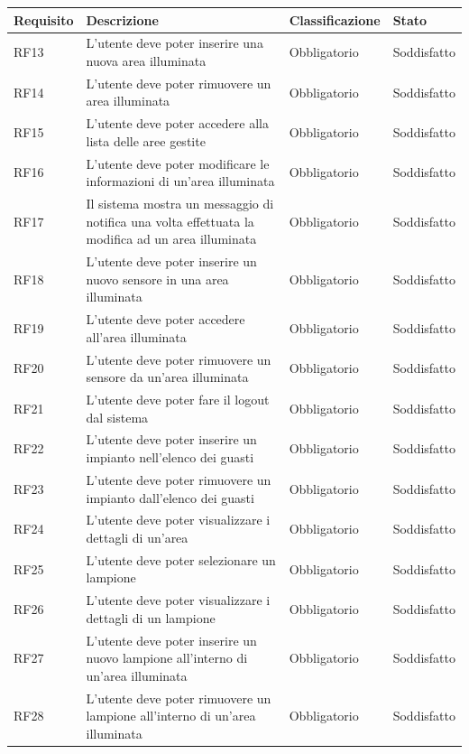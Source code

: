 \documentclass[12pt]{article}
\begin{document}
\begin{tabular}{ |p{1.8cm}|p{5.2cm}|p{2.5cm}| p{3.5cm}| }
	\hline
	Requisito& Descrizione &Classificazione & Stato \\
	\hline
	RF13	 & L'utente deve poter inserire una nuova area illuminata & Obbligatorio & Soddisfatto \\
	\hline
	RF14	 & L'utente deve poter rimuovere un area illuminata & Obbligatorio & Soddisfatto \\
	\hline
	RF15	 & L'utente deve poter accedere alla lista delle aree gestite & Obbligatorio & Soddisfatto \\
	\hline				
	RF16	 & L'utente deve poter modificare le informazioni di un'area illuminata	& Obbligatorio & Soddisfatto \\
	\hline				
	RF17	 & Il sistema mostra un messaggio di notifica una volta effettuata la modifica ad un area illuminata & Obbligatorio & Soddisfatto \\
	\hline				
	RF18	 & L'utente deve poter inserire un nuovo sensore in una area illuminata & Obbligatorio & Soddisfatto \\
	\hline				
	RF19	 & L'utente deve poter accedere all'area illuminata & Obbligatorio & Soddisfatto \\
	\hline 				
	RF20	 & L'utente deve poter rimuovere un sensore da un'area illuminata & Obbligatorio & Soddisfatto \\
	\hline				
	RF21	 & L'utente deve poter fare il logout dal sistema & Obbligatorio & Soddisfatto \\
	\hline										
	RF22	 & L'utente deve poter inserire un impianto nell'elenco dei guasti & Obbligatorio & Soddisfatto \\
	\hline				
	RF23	 & L'utente deve poter rimuovere un impianto dall'elenco dei guasti & Obbligatorio & Soddisfatto \\
	\hline				
	RF24	 & L'utente deve poter visualizzare i dettagli di un'area & Obbligatorio & Soddisfatto \\
	\hline				
	RF25	 & L'utente deve poter selezionare un lampione & Obbligatorio & Soddisfatto \\
	\hline				
	RF26	 & L'utente deve poter visualizzare i dettagli di un lampione & Obbligatorio & Soddisfatto \\
	\hline				
	RF27	 & L'utente deve poter inserire un nuovo lampione all'interno di un'area illuminata & Obbligatorio & Soddisfatto \\
	\hline				
	RF28	 & L'utente deve poter rimuovere un lampione all'interno di un'area illuminata & Obbligatorio & Soddisfatto \\
	\hline
\end{tabular}
	
\end{document}
